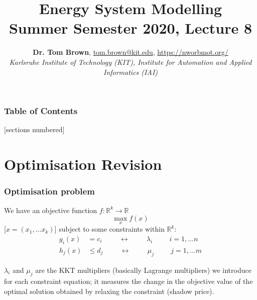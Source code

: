 \documentclass[10pt,aspectratio=169,dvipsnames]{beamer}
\title{Energy System Modelling\\ Summer Semester 2020, Lecture 8}
\author{
  {\bf Dr. Tom Brown}, \href{mailto:tom.brown@kit.edu}{tom.brown@kit.edu}, \url{https://nworbmot.org/}\\
  \emph{Karlsruhe Institute of Technology (KIT), Institute for Automation and Applied Informatics (IAI)}
}
\date{}
\newcommand{\R}{\mathbb{R}}
\def\l{\lambda}
\def\m{\mu}
\begin{document}
\maketitle


\begin{frame}

  \frametitle{Table of Contents}
  [sections numbered]
  \tableofcontents[hideallsubsections]
\end{frame}


\section{Optimisation Revision}

\begin{frame}
  \frametitle{Optimisation problem}


We have an \alert{objective function} $f: \R^k \to \R$
\begin{equation*}
  \max_{x} f(x)
\end{equation*}
[$x = (x_1, \dots x_k)$] subject to some \alert{constraints} within $\R^k$:
\begin{align*}
  g_i(x) & = c_i \hspace{1cm}\leftrightarrow\hspace{1cm} \l_i \hspace{1cm} i = 1,\dots n \\
  h_j(x) & \leq d_j \hspace{1cm}\leftrightarrow\hspace{1cm} \m_j \hspace{1cm} j = 1,\dots m
\end{align*}

$\l_i$ and $\m_j$ are the \alert{KKT multipliers} (basically Lagrange multipliers) we introduce for
each constraint equation; it measures the change in the objective value of the optimal solution obtained by relaxing the constraint (shadow price).

\end{frame}
\end{document}
